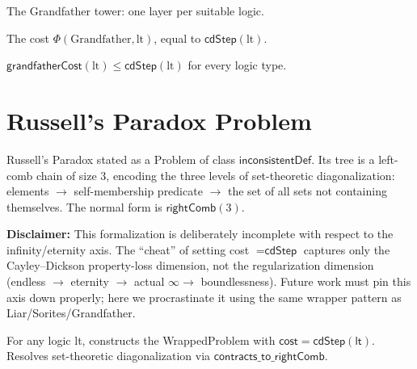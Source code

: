 \begin{definition}
\label{def:grandfather_tower}
\leanok
{}
The Grandfather tower: one layer per suitable logic.
\end{definition}

\begin{definition}
\label{def:grandfather_cost}
\leanok
{}
The cost $\Phi(\text{Grandfather}, \text{lt})$, equal to $\textsf{cdStep}(\text{lt})$.
\end{definition}

\begin{theorem}
\label{thm:grandfather_cost_bound}
\leanok
{}
$\textsf{grandfatherCost}(\text{lt}) \le \textsf{cdStep}(\text{lt})$ for every logic type.
\end{theorem}

\section{Russell's Paradox Problem}

\begin{definition}
\label{def:russells_problem}
\leanok
{}
Russell's Paradox stated as a \textsf{Problem} of class $\mathsf{inconsistentDef}$.
Its tree is a left-comb chain of size 3, encoding the three levels of
set-theoretic diagonalization: elements $\to$ self-membership predicate $\to$
the set of all sets not containing themselves.
The normal form is $\mathsf{rightComb}(3)$.

\textbf{Disclaimer:} This formalization is deliberately incomplete with respect to
the infinity/eternity axis. The ``cheat'' of setting cost $= \textsf{cdStep}$
captures only the Cayley--Dickson property-loss dimension, not the
regularization dimension (endless $\to$ eternity $\to$ actual $\infty \to$
boundlessness). Future work must pin this axis down properly; here we
procrastinate it using the same wrapper pattern as Liar/Sorites/Grandfather.
\end{definition}

\begin{definition}
\label{def:russells_wrapper}
\leanok
{}
For any logic \textsf{lt}, constructs the \textsf{WrappedProblem} with
$\textsf{cost} = \textsf{cdStep}(\textsf{lt})$. Resolves set-theoretic
diagonalization via $\mathsf{contracts\_to\_rightComb}$.
\end{definition}

